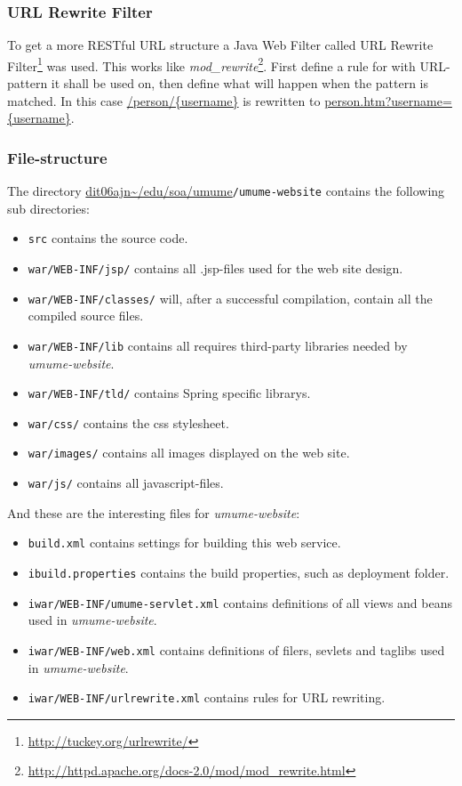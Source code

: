 \documentclass[titlepage, twocolumn, a4paper, 10pt]{article}
\def\pathtocode{\url{dit06ajn~/edu/soa/umume}}
\begin{document}
\subsubsection{URL Rewrite Filter}\label{sec:urlfilter}
To get a more RESTful URL structure a Java Web Filter called URL
Rewrite Filter\footnote{\url{http://tuckey.org/urlrewrite/}} was
used. This works like
\textit{mod\_rewrite}\footnote{\url{http://httpd.apache.org/docs-2.0/mod/mod_rewrite.html}}.
First define a rule for with URL-pattern it shall be used on, then
define what will happen when the pattern is matched. In this case
\url{/person/{username}} is rewritten to
\url{person.htm?username={username}}.

\subsubsection{File-structure}\label{sec:filestructureweb}
The directory \pathtocode\texttt{/umume-website} contains the
following sub directories:
\begin{itemize}
\item \verb!src! contains the source code.
\item \verb!war/WEB-INF/jsp/! contains all .jsp-files used for the web site design.
\item \verb!war/WEB-INF/classes/! will, after a successful compilation,
  contain all the compiled source files.
\item \verb!war/WEB-INF/lib! contains all requires third-party libraries
  needed by \textit{umume-website}.
\item \verb!war/WEB-INF/tld/! contains Spring specific librarys.
\item \verb!war/css/! contains the css stylesheet.
\item \verb!war/images/! contains all images displayed on the web site.
\item \verb!war/js/! contains all javascript-files.
\end{itemize}

And these are the interesting files for \textit{umume-website}:
\begin{itemize}
\item \verb!build.xml! contains settings for building this web
  service.
\item \verb!ibuild.properties! contains the build properties, such as
  deployment folder.
\item \verb!iwar/WEB-INF/umume-servlet.xml! contains definitions of
  all views and beans used in \textit{umume-website}.
\item \verb!iwar/WEB-INF/web.xml! contains definitions of filers, sevlets and
  taglibs used in \textit{umume-website}.
\item \verb!iwar/WEB-INF/urlrewrite.xml! contains rules for URL rewriting.
\end{itemize}
\end{document}
